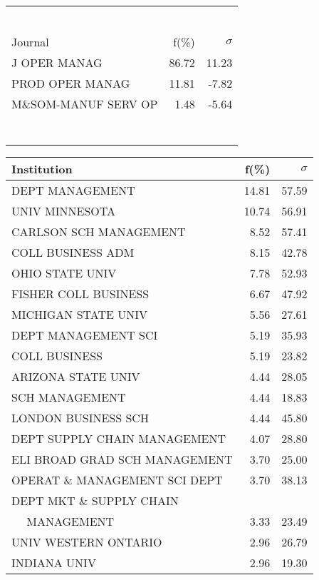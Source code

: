 \documentclass[a4paper,11pt]{report}
\begin{document}
\begin{landscape}
\begin{table}[!ht]
{\begin{tabular}{|l r r|}
 &  & \\
 &  & \\
 &  & \\
 &  & \\
 &  & \\
 &  & \\
\hline
\hline
Journal & f(\%) & $\sigma$\\
\hline
J OPER MANAG & 86.72 & 11.23\\
PROD OPER MANAG & 11.81 & -7.82\\
M\&SOM-MANUF SERV OP & 1.48 & -5.64\\
 &  & \\
 &  & \\
 &  & \\
 &  & \\
 &  & \\
 &  & \\
 &  & \\
\hline
\end{tabular}
}
{\scriptsize\begin{tabular}{|l r r|}
\hline
Institution & f(\%) & $\sigma$\\
\hline
DEPT MANAGEMENT & 14.81 & 57.59\\
UNIV MINNESOTA & 10.74 & 56.91\\
CARLSON SCH MANAGEMENT & 8.52 & 57.41\\
COLL BUSINESS ADM & 8.15 & 42.78\\
OHIO STATE UNIV & 7.78 & 52.93\\
FISHER COLL BUSINESS & 6.67 & 47.92\\
MICHIGAN STATE UNIV & 5.56 & 27.61\\
DEPT MANAGEMENT SCI & 5.19 & 35.93\\
COLL BUSINESS & 5.19 & 23.82\\
ARIZONA STATE UNIV & 4.44 & 28.05\\
SCH MANAGEMENT & 4.44 & 18.83\\
LONDON BUSINESS SCH & 4.44 & 45.80\\
DEPT SUPPLY CHAIN MANAGEMENT & 4.07 & 28.80\\
ELI BROAD GRAD SCH MANAGEMENT & 3.70 & 25.00\\
OPERAT \& MANAGEMENT SCI DEPT & 3.70 & 38.13\\
DEPT MKT \& SUPPLY CHAIN &  & \\
$\quad$ MANAGEMENT & 3.33 & 23.49\\
UNIV WESTERN ONTARIO & 2.96 & 26.79\\
INDIANA UNIV & 2.96 & 19.30\\

\end{tabular}}
\end{table}
\end{landscape}
\end{document}
